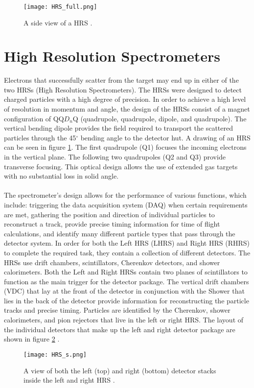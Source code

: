 \begin{figure}[t]
	\centering
	\texttt{[image: HRS\_full.png]}
	\caption{A side view of a HRS \cite{HallA}.
		\label{hrsfull}}
\end{figure}

\section{High Resolution Spectrometers}\label{sec:HRS}
\paragraph{}
Electrons that successfully scatter from the target may end up in either of the two HRSs (High Resolution Spectrometers). The HRSs were designed to detect charged particles with a high degree of precision. 
In order to achieve a high level of resolution in momentum and angle, the design of the HRSs consist of a magnet configuration of QQ$D_n$Q (quadrupole, quadrupole, dipole, and quadrupole). The vertical bending dipole provides the field required to transport the scattered particles through the 45$^\circ$ bending angle to the detector hut. A drawing of an HRS can be seen in figure \ref{hrsfull}. The first quadrupole (Q1) focuses the incoming electrons in the vertical plane. The following two quadrupoles (Q2 and Q3) provide transverse focusing. This optical design allows the use of extended gas targets with no substantial loss in solid angle\cite{HallA}.  
\paragraph{}The spectrometer's design allows for the performance of various functions, which include: triggering the data acquisition system (DAQ) when certain requirements are met, gathering the position and direction of individual particles to reconstruct a track, provide precise timing information for time of flight calculations, and identify many different particle types that pass through the detector system. In order for both the Left HRS (LHRS) and Right HRS (RHRS) to  complete the required task, they contain a collection of different detectors. The HRSs use drift chambers, scintillators, Cherenkov detectors, and shower calorimeters. Both the Left and Right HRSs contain two planes of scintillators to function as the main trigger for the detector package. The vertical drift chambers (VDC) that lay at the front of the detector in conjunction with the Shower that lies in the back of the detector provide information for reconstructing the particle tracks and precise timing. Particles are identified by the Cherenkov, shower calorimeters, and pion rejectors that live in the left or right HRS. The layout of the individual detectors that make up the left and right detector package are shown in figure \ref{hrsss}  \cite{HallA}.
\begin{figure}[t]
	\centering
	\texttt{[image: HRS\_s.png]}
	\caption{A view of both the left (top) and right (bottom) detector stacks inside the left and right HRS \cite{HallA}.
	\label{hrsss}}
\end{figure}

